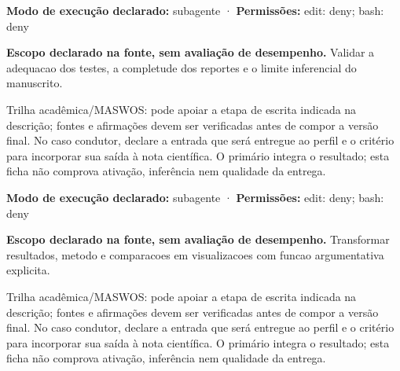 \begin{arquitetura}
\textbf{Modo de execução declarado:} subagente · \textbf{Permissões:} edit: deny; bash: deny
\end{arquitetura}


\begin{descricao}
\textbf{Escopo declarado na fonte, sem avaliação de desempenho.}
Validar a adequacao dos testes, a completude dos reportes e o limite inferencial do manuscrito.
\end{descricao}

\begin{funcao}
Trilha acadêmica/MASWOS: pode apoiar a etapa de escrita indicada na descrição; fontes e afirmações devem ser verificadas antes de compor a versão final. No caso condutor, declare a entrada que será entregue ao perfil e o critério para incorporar sua saída à nota científica. O primário integra o resultado; esta ficha não comprova ativação, inferência nem qualidade da entrega.
\end{funcao}

\begin{arquitetura}
\textbf{Modo de execução declarado:} subagente · \textbf{Permissões:} edit: deny; bash: deny
\end{arquitetura}


\begin{descricao}
\textbf{Escopo declarado na fonte, sem avaliação de desempenho.}
Transformar resultados, metodo e comparacoes em visualizacoes com funcao argumentativa explicita.
\end{descricao}

\begin{funcao}
Trilha acadêmica/MASWOS: pode apoiar a etapa de escrita indicada na descrição; fontes e afirmações devem ser verificadas antes de compor a versão final. No caso condutor, declare a entrada que será entregue ao perfil e o critério para incorporar sua saída à nota científica. O primário integra o resultado; esta ficha não comprova ativação, inferência nem qualidade da entrega.
\end{funcao}

